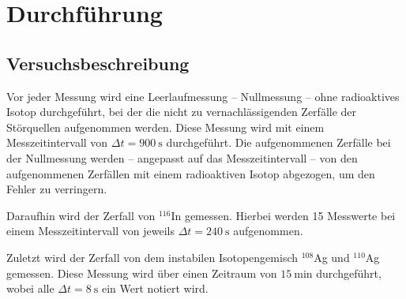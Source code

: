 \section{Durchführung}
\label{sec:Durchführung}



\subsection{Versuchsbeschreibung}
\label{sec:Versuchsbeschreibung}
Vor jeder Messung wird eine Leerlaufmessung -- Nullmessung -- ohne radioaktives Isotop
durchgeführt, bei der die
nicht zu vernachlässigenden Zerfälle der Störquellen aufgenommen werden. Diese Messung wird mit
einem Messzeitintervall von $\Delta t = \SI{900}{\second}$ durchgeführt. Die aufgenommenen
Zerfälle bei der Nullmessung werden -- angepasst auf das Messzeitintervall -- von den
aufgenommenen Zerfällen mit einem radioaktiven Isotop abgezogen, um den Fehler zu verringern.

Daraufhin wird der Zerfall von $^{116}$In gemessen. Hierbei werden 15 Messwerte bei einem
Messzeitintervall von jeweils $\Delta t = \SI{240}{\second}$ aufgenommen.

Zuletzt wird der Zerfall von dem instabilen Isotopengemisch $^{108}$Ag und $^{110}$Ag gemessen.
Diese Messung wird über einen Zeitraum von $\SI{15}{\minute}$ durchgeführt, wobei alle
$\Delta t = \SI{8}{\second}$ ein Wert notiert wird.
